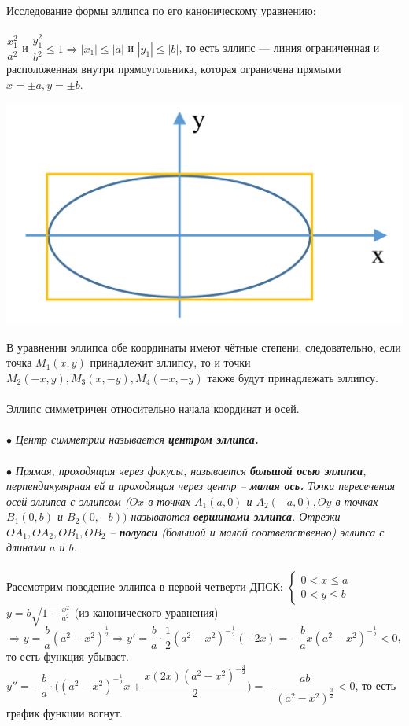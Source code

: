 Исследование формы эллипса по его каноническому уравнению:\\\\
$\dfrac{x_1^2}{a^2}$ и $\dfrac{y_1^2}{b^2} \leqslant 1 \Rightarrow |x_1| \leqslant |a|$ и $|y_1| \leqslant |b|$, то есть эллипс --- линия ограниченная и расположенная внутри прямоугольника, которая ограничена прямыми $x = \pm a, y = \pm b$.
\begin{center}
	\includegraphics[scale=0.2]{images/ellipse_2.png}
\end{center}
В уравнении эллипса обе координаты имеют чётные степени, следовательно,
если точка $M_1(x, y)$ принадлежит эллипсу, то и точки $M_2(-x, y),
M_3(x, -y), M_4(-x, -y)$ также будут принадлежать эллипсу.\\\\
Эллипс симметричен относительно начала координат и осей.\\\\ $\bullet$ \textit{Центр симметрии называется \textbf{центром
		эллипса.}}\\\\
$\bullet$ \textit{Прямая, проходящая через фокусы, называется \textbf{большой осью эллипса}, перпендикулярная ей и
	проходящая через центр – \textbf{малая ось.} Точки пересечения осей эллипса с эллипсом ($Ox$ в точках
	$A_1(a, 0)$ и $A_2(-a, 0), Oy$ в точках $B_1(0, b)$ и $B_2(0, -b))$ называются \textbf{вершинами эллипса}. Отрезки $OA_1,OA_2, OB_1, OB_2$ – \textbf{полуоси} (большой и малой соответственно) эллипса с длинами $a$ и $b$.}\\\\
Рассмотрим поведение эллипса в первой четверти ДПСК: $\begin{cases}
	0 < x \leqslant a \\
	0 < y \leqslant b
\end{cases}$\\
$y = b \sqrt{1 - \frac{x^2}{a^2}}$ (из канонического уравнения) $\Rightarrow y=\dfrac{b}{a}(a^2 - x^2)^{\frac{1}{2}} \Rightarrow y' = \dfrac{b}{a}\cdot\dfrac{1}{2}(a^2 - x^2)^{-\frac{1}{2}}(-2x) = -\dfrac{b}{a}x(a^2 - x^2)^{-\frac{1}{2}} < 0$, то есть функция убывает. $y'' = - \dfrac{b}{a}\cdot\Big((a^2-x^2)^{-\frac{1}{2}}x + \dfrac{x(2x)(a^2-x^2)^{-\frac{3}{2}}}{2}\Big) = -\dfrac{ab}{(a^2-x^2)^{\frac{3}{2}}} < 0$, то есть график функции вогнут.

